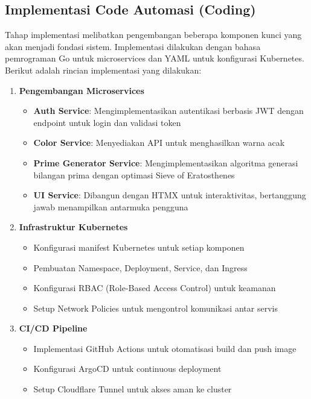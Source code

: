 \subsection{Implementasi Code Automasi (Coding)}
Tahap implementasi melibatkan pengembangan beberapa komponen kunci yang akan
menjadi fondasi sistem. Implementasi dilakukan dengan bahasa pemrograman Go
untuk microservices dan YAML untuk konfigurasi Kubernetes. Berikut adalah
rincian implementasi yang dilakukan:

\begin{enumerate}[label=\alph*.]
  \item \textbf{Pengembangan Microservices}
        \begin{itemize}
          \item \textbf{Auth Service}: Mengimplementasikan autentikasi berbasis JWT dengan endpoint untuk login dan validasi token
          \item \textbf{Color Service}: Menyediakan API untuk menghasilkan warna acak
          \item \textbf{Prime Generator Service}: Mengimplementasikan algoritma generasi bilangan prima dengan optimasi Sieve of Eratosthenes
          \item \textbf{UI Service}: Dibangun dengan HTMX untuk interaktivitas, bertanggung jawab menampilkan antarmuka pengguna
        \end{itemize}

  \item \textbf{Infrastruktur Kubernetes}
        \begin{itemize}
          \item Konfigurasi manifest Kubernetes untuk setiap komponen
          \item Pembuatan Namespace, Deployment, Service, dan Ingress
          \item Konfigurasi RBAC (Role-Based Access Control) untuk keamanan
          \item Setup Network Policies untuk mengontrol komunikasi antar servis
        \end{itemize}

  \item \textbf{CI/CD Pipeline}
        \begin{itemize}
          \item Implementasi GitHub Actions untuk otomatisasi build dan push image
          \item Konfigurasi ArgoCD untuk continuous deployment
          \item Setup Cloudflare Tunnel untuk akses aman ke cluster
        \end{itemize}
\end{enumerate}

